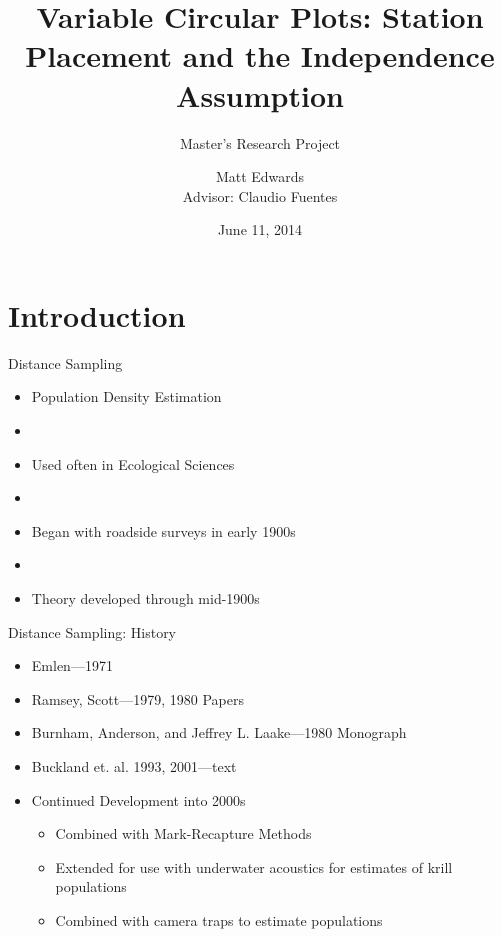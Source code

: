 \documentclass{beamer}
\title{Variable Circular Plots: Station Placement and the Independence Assumption}
\subtitle{Master's Research Project}
\author{Matt Edwards\\ Advisor: Claudio Fuentes}
\date{June 11, 2014}
\begin{document}
\begin{frame}
	\titlepage
\end{frame}


\section{Introduction}

\begin{frame}{Distance Sampling}
	\begin{itemize}
	\item Population Density Estimation
	\item[]
	\item Used often in Ecological Sciences
	\item[]
	\item Began with roadside surveys in early 1900s
	\item[]
	\item Theory developed through mid-1900s
	
	\end{itemize}
\end{frame}

\begin{frame}{Distance Sampling: History}
	\begin{itemize}
	\item Emlen---1971
	\item Ramsey, Scott---1979, 1980 Papers
	\item Burnham, Anderson, and Jeffrey L. Laake---1980 Monograph
	\item Buckland et. al. 1993, 2001---text
	\item Continued Development into 2000s
	\begin{itemize}
	\item Combined with Mark-Recapture Methods
	\item Extended for use with underwater acoustics for estimates of krill populations 
	\item Combined with camera traps to estimate populations
	\end{itemize}
	\end{itemize}
\end{frame}
\end{document}
